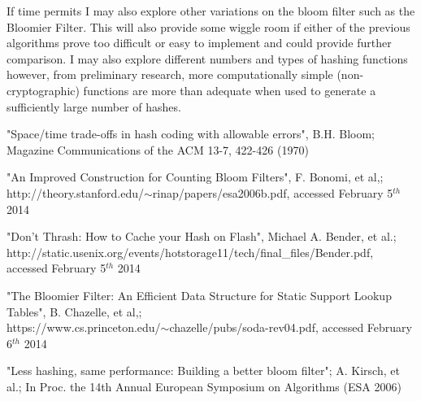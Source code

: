 \documentclass[10pt]{article}
\begin{document}
If time permits I may also explore other variations on the bloom filter such as the Bloomier Filter\cite{chazelle}. This will also provide some wiggle room if either of the previous algorithms prove too difficult or easy to implement and could provide further comparison. I may also explore different numbers and types of hashing functions however, from preliminary research, more computationally simple (non-cryptographic) functions are more than adequate when used to generate a sufficiently large number of hashes\cite{kirsch}.

\begin{thebibliography}{99} %

"Space/time trade-offs in hash coding with allowable errors", B.H. Bloom; Magazine
Communications of the ACM 13-7, 422-426 (1970)

"An Improved Construction for Counting Bloom Filters", F. Bonomi, et al,; \\
http://theory.stanford.edu/$\sim$rinap/papers/esa2006b.pdf, accessed February 5$^{th}$ 2014

"Don’t Thrash: How to Cache your Hash on Flash", Michael A. Bender, et al.; \\
http://static.usenix.org/events/hotstorage11/tech/final\_files/Bender.pdf, accessed February 5$^{th}$ 2014 

"The Bloomier Filter: An Efficient Data Structure for Static Support Lookup Tables", B. Chazelle, et al,;\\
https://www.cs.princeton.edu/$\sim$chazelle/pubs/soda-rev04.pdf, accessed February 6$^{th}$ 2014

"Less hashing, same performance: Building a better bloom filter"; A. Kirsch, et al.; 	In Proc. the 14th Annual European Symposium on Algorithms (ESA 2006)

\end{thebibliography}
\end{document}
